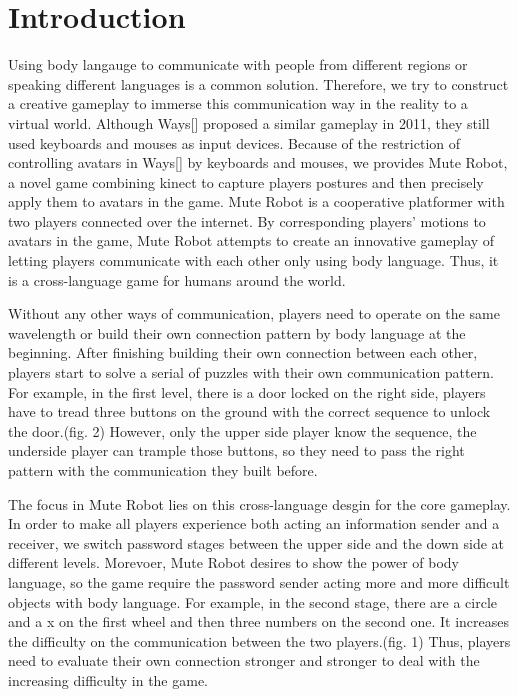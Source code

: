 \documentclass{chi-ext}
\begin{document}
\section{Introduction}
Using body langauge to communicate with people from different regions or speaking different languages is a common solution. 
Therefore, we try to construct a creative gameplay to immerse this communication way in the reality to a virtual world. 
Although Ways[] proposed a similar gameplay in 2011, they still used keyboards and mouses as input devices.
Because of the restriction of controlling avatars in Ways[] by keyboards and mouses, we provides Mute Robot, a novel game combining kinect to capture players postures and then precisely apply them to avatars in the game.
Mute Robot is a cooperative platformer with two players connected over the internet.
By corresponding players' motions to avatars in the game, Mute Robot attempts to create an innovative gameplay of letting players communicate with each other only using body language.
Thus, it is a cross-language game for humans around the world.

Without any other ways of communication, players need to operate on the same wavelength or build their own connection pattern by body language at the beginning.
After finishing building their own connection between each other, players start to solve a serial of puzzles with their own communication pattern.
For example, in the first level, there is a door locked on the right side, players have to tread three buttons on the ground with the correct sequence to unlock the door.(fig. 2)
However, only the upper side player know the sequence, the underside player can trample those buttons, so they need to pass the right pattern with the communication they built before.

The focus in Mute Robot lies on this cross-language desgin for the core gameplay.
In order to make all players experience both acting an information sender and a receiver, we switch password stages between the upper side and the down side at different levels.
Morevoer, Mute Robot desires to show the power of body language, so the game require the password sender acting more and more difficult objects with body language.
For example, in the second stage, there are a circle and a x on the first wheel and then three numbers on the second one. It increases the difficulty on the communication between the two players.(fig. 1)
Thus, players need to evaluate their own connection stronger and stronger to deal with the increasing difficulty in the game. 
\end{document}
